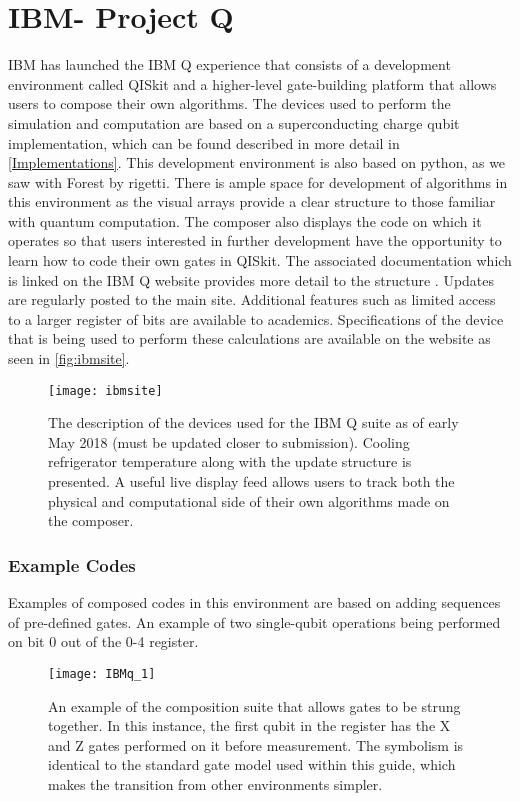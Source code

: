 \section{IBM- Project Q}
IBM has launched the IBM Q experience that consists of a development environment called QISkit and a higher-level gate-building platform that allows users to compose their own algorithms. The devices used to perform the simulation and computation are based on a superconducting charge qubit implementation, which can be found described in more detail in \autoref{Implementations}.  This development environment is also based on python, as we saw with Forest by rigetti. There is ample space for development of algorithms in this environment as the visual arrays provide a clear structure to those familiar with quantum computation. The composer also displays the code on which it operates so that users interested in further development have the opportunity to learn how to code their own gates in QISkit. The associated documentation which is linked on the IBM Q website provides more detail to the structure \cite{coles2018quantum}. Updates are regularly posted to the main site. Additional features such as limited access to a larger register of bits are available to academics. Specifications of the device that is being used to perform these calculations are available on the website as seen in \autoref{fig:ibmsite}. 

\begin{figure}[h!]
\centering
\texttt{[image: ibmsite]}
\caption{The description of the devices used for the IBM Q suite as of early May 2018 (must be updated closer to submission). Cooling refrigerator temperature along with the update structure is presented. A useful live display feed allows users to track both the physical and computational side of their own algorithms made on the composer.}
\label{fig:ibmsite}
\end{figure}

\subsubsection{Example Codes}
Examples of composed codes in this environment are based on adding sequences of pre-defined gates. An example of two single-qubit operations being performed on bit 0 out of the 0-4 register.  
\begin{figure}[h!]
\centering
\texttt{[image: IBMq\_1]}
\caption{An example of the composition suite that allows gates to be strung together. In this instance, the first qubit in the register has the X and Z gates performed on it before measurement. The symbolism is identical to the standard gate model used within this guide, which makes the transition from other environments simpler.}
\end{figure}
